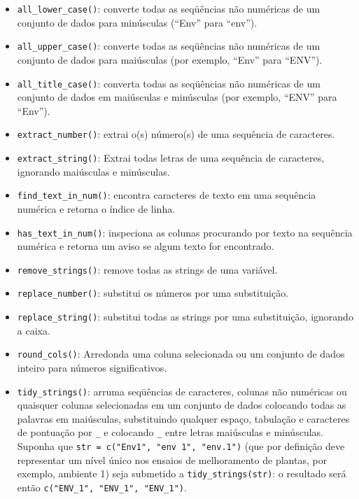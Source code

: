 \documentclass[
]{book}
\providecommand{\tightlist}{%
  \setlength{\itemsep}{0pt}\setlength{\parskip}{0pt}}
\begin{document}
\begin{itemize}
\tightlist
\item
  \texttt{all\_lower\_case()}: converte todas as seqüências não numéricas de um conjunto de dados para minúsculas (``Env'' para ``env''). 
\item
  \texttt{all\_upper\_case()}: converte todas as seqüências não numéricas de um conjunto de dados para maiúsculas (por exemplo, ``Env'' para ``ENV'').
\item
  \texttt{all\_title\_case()}: converta todas as seqüências não numéricas de um conjunto de dados em maiúsculas e minúsculas (por exemplo, ``ENV'' para ``Env'').
\item
  \texttt{extract\_number()}: extrai o(s) número(s) de uma sequência de caracteres.
\item
  \texttt{extract\_string()}: Extrai todas letras de uma sequência de caracteres, ignorando maiúsculas e minúsculas.
\item
  \texttt{find\_text\_in\_num()}: encontra caracteres de texto em uma sequência numérica e retorna o índice de linha.
\item
  \texttt{has\_text\_in\_num()}: inspeciona as colunas procurando por texto na sequência numérica e retorna um aviso se algum texto for encontrado.
\item
  \texttt{remove\_strings()}: remove todas as strings de uma variável.
\item
  \texttt{replace\_number()}: substitui os números por uma substituição.
\item
  \texttt{replace\_string()}: substitui todas as strings por uma substituição, ignorando a caixa.
\item
  \texttt{round\_cols()}: Arredonda uma coluna selecionada ou um conjunto de dados inteiro para números significativos.
\item
  \texttt{tidy\_strings()}: arruma seqüências de caracteres, colunas não numéricas ou quaisquer colunas selecionadas em um conjunto de dados colocando todas as palavras em maiúsculas, substituindo qualquer espaço, tabulação e caracteres de pontuação por \texttt{\textquotesingle{}\_\textquotesingle{}} e colocando \texttt{\textquotesingle{}\_\textquotesingle{}} entre letras maiúsculas e minúsculas. Suponha que \texttt{str\ =\ c("Env1",\ "env\ 1",\ "env.1")} (que por definição deve representar um nível único nos ensaios de melhoramento de plantas, por exemplo, ambiente 1) seja submetido a \texttt{tidy\_strings(str)}: o resultado será então \texttt{c("ENV\_1",\ "ENV\_1",\ "ENV\_1")}.
\end{itemize}
\end{document}
